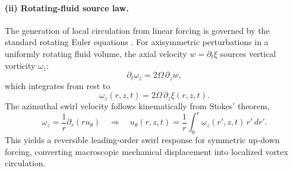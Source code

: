 \documentclass[11pt,a4paper]{article}
\begin{document}
\paragraph{(ii) Rotating-fluid source law.} The generation of local circulation from linear forcing is governed by the standard rotating Euler equations \cite{Greenspan1968, Batchelor1967}. For axisymmetric perturbations in a uniformly rotating fluid volume, the axial velocity $w = \partial_t \xi$ sources vertical vorticity $\omega_z$:
\begin{equation}
\label{eq:wz}
\partial_t \omega_z = 2\Omega\,\partial_z w,
\end{equation}
which integrates from rest to
\begin{equation}
\label{eq:wzxi}
\omega_z(r,z,t)=2\Omega\,\partial_z \xi(r,z,t).
\end{equation}
The azimuthal swirl velocity follows kinematically from Stokes' theorem,
\begin{equation}
\label{eq:utheta}
\omega_z = \frac{1}{r}\partial_r(r u_\theta)
\quad\Longrightarrow\quad
u_\theta(r,z,t)=\frac{1}{r}\int_0^r \omega_z(r',z,t)\,r'\,dr'.
\end{equation}
This yields a reversible leading-order swirl response for symmetric up-down forcing, converting macroscopic mechanical displacement into localized vortex circulation.
\end{document}
